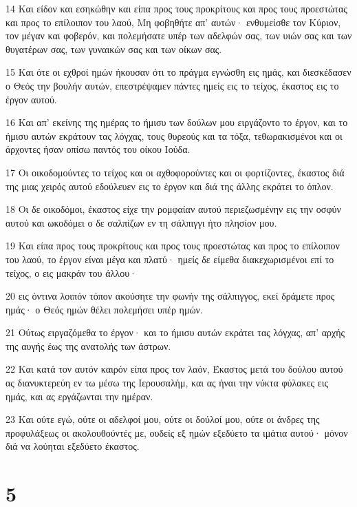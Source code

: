 \par 14 Και είδον και εσηκώθην και είπα προς τους προκρίτους και προς τους προεστώτας και προς το επίλοιπον του λαού, Μη φοβηθήτε απ' αυτών· ενθυμείσθε τον Κύριον, τον μέγαν και φοβερόν, και πολεμήσατε υπέρ των αδελφών σας, των υιών σας και των θυγατέρων σας, των γυναικών σας και των οίκων σας.
\par 15 Και ότε οι εχθροί ημών ήκουσαν ότι το πράγμα εγνώσθη εις ημάς, και διεσκέδασεν ο Θεός την βουλήν αυτών, επεστρέψαμεν πάντες ημείς εις το τείχος, έκαστος εις το έργον αυτού.
\par 16 Και απ' εκείνης της ημέρας το ήμισυ των δούλων μου ειργάζοντο το έργον, και το ήμισυ αυτών εκράτουν τας λόγχας, τους θυρεούς και τα τόξα, τεθωρακισμένοι και οι άρχοντες ήσαν οπίσω παντός του οίκου Ιούδα.
\par 17 Οι οικοδομούντες το τείχος και οι αχθοφορούντες και οι φορτίζοντες, έκαστος διά της μιας χειρός αυτού εδούλευεν εις το έργον και διά της άλλης εκράτει το όπλον.
\par 18 Οι δε οικοδόμοι, έκαστος είχε την ρομφαίαν αυτού περιεζωσμένην εις την οσφύν αυτού και ωκοδόμει ο δε σαλπίζων εν τη σάλπιγγι ήτο πλησίον μου.
\par 19 Και είπα προς τους προκρίτους και προς τους προεστώτας και προς το επίλοιπον του λαού, το έργον είναι μέγα και πλατύ· ημείς δε είμεθα διακεχωρισμένοι επί το τείχος, ο εις μακράν του άλλου·
\par 20 εις όντινα λοιπόν τόπον ακούσητε την φωνήν της σάλπιγγος, εκεί δράμετε προς ημάς· ο Θεός ημών θέλει πολεμήσει υπέρ ημών.
\par 21 Ούτως ειργαζόμεθα το έργον· και το ήμισυ αυτών εκράτει τας λόγχας, απ' αρχής της αυγής έως της ανατολής των άστρων.
\par 22 Και κατά τον αυτόν καιρόν είπα προς τον λαόν, Έκαστος μετά του δούλου αυτού ας διανυκτερεύη εν τω μέσω της Ιερουσαλήμ, και ας ήναι την νύκτα φύλακες εις ημάς, και ας εργάζωνται την ημέραν.
\par 23 Και ούτε εγώ, ούτε οι αδελφοί μου, ούτε οι δούλοί μου, ούτε οι άνδρες της προφυλάξεως οι ακολουθούντές με, ουδείς εξ ημών εξεδύετο τα ιμάτια αυτού· μόνον διά να λούηται εξεδύετο έκαστος.

\chapter{5}

